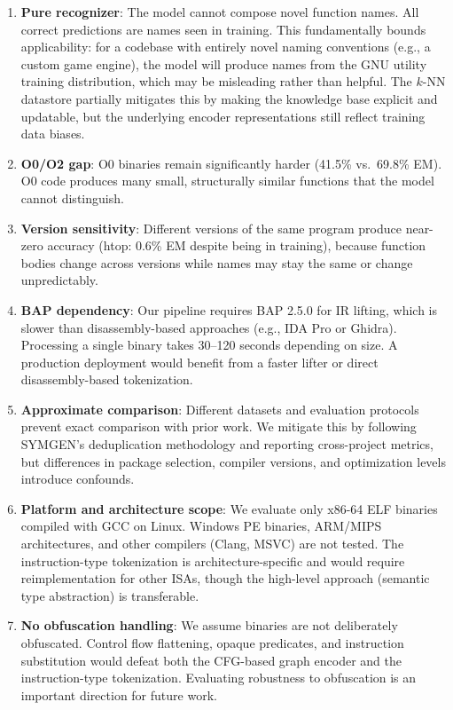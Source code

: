 \documentclass[sigconf,nonacm]{acmart}
\begin{document}
\begin{enumerate}
    \item \textbf{Pure recognizer}: The model cannot compose novel function names. All correct predictions are names seen in training. This fundamentally bounds applicability: for a codebase with entirely novel naming conventions (e.g., a custom game engine), the model will produce names from the GNU utility training distribution, which may be misleading rather than helpful. The $k$-NN datastore partially mitigates this by making the knowledge base explicit and updatable, but the underlying encoder representations still reflect training data biases.

    \item \textbf{O0/O2 gap}: O0 binaries remain significantly harder (41.5\% vs.\ 69.8\% EM). O0 code produces many small, structurally similar functions that the model cannot distinguish.

    \item \textbf{Version sensitivity}: Different versions of the same program produce near-zero accuracy (htop: 0.6\% EM despite being in training), because function bodies change across versions while names may stay the same or change unpredictably.

    \item \textbf{BAP dependency}: Our pipeline requires BAP 2.5.0 for IR lifting, which is slower than disassembly-based approaches (e.g., IDA Pro or Ghidra). Processing a single binary takes 30--120 seconds depending on size. A production deployment would benefit from a faster lifter or direct disassembly-based tokenization.

    \item \textbf{Approximate comparison}: Different datasets and evaluation protocols prevent exact comparison with prior work. We mitigate this by following SYMGEN's deduplication methodology and reporting cross-project metrics, but differences in package selection, compiler versions, and optimization levels introduce confounds.

    \item \textbf{Platform and architecture scope}: We evaluate only x86-64 ELF binaries compiled with GCC on Linux. Windows PE binaries, ARM/MIPS architectures, and other compilers (Clang, MSVC) are not tested. The instruction-type tokenization is architecture-specific and would require reimplementation for other ISAs, though the high-level approach (semantic type abstraction) is transferable.

    \item \textbf{No obfuscation handling}: We assume binaries are not deliberately obfuscated. Control flow flattening, opaque predicates, and instruction substitution would defeat both the CFG-based graph encoder and the instruction-type tokenization. Evaluating robustness to obfuscation is an important direction for future work.
\end{enumerate}
\end{document}

